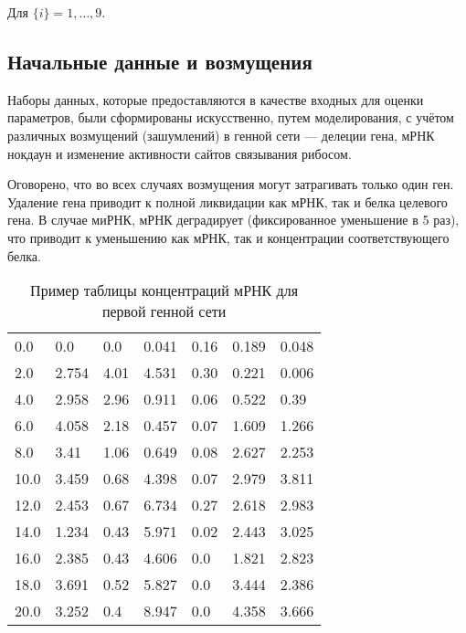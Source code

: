 Для $\{i\} = 1, \dots, 9$.

\subsection{Начальные данные и возмущения} \label{s2_4}

Наборы данных, которые предоставляются в качестве входных для оценки параметров,
были сформированы искусственно, путем моделирования, с учётом различных 
возмущений (зашумлений) в генной сети — делеции гена, мРНК нокдаун и изменение 
активности сайтов связывания рибосом. 

Оговорено, что во всех случаях возмущения могут затрагивать только один ген. 
Удаление гена приводит к полной ликвидации как мРНК, так и белка целевого гена. 
В случае миРНК, мРНК деградирует (фиксированное уменьшение в 5 раз), что 
приводит к уменьшению как мРНК, так и концентрации соответствующего белка.

\begin{table}[h]
  \centering
    \begin{tabular}{l|llllll}
        0.0	  & 0.0    & 0.0   & 0.041  & 0.16  & 0.189  & 0.048 \\
        2.0	  & 2.754  & 4.01  & 4.531  & 0.30  & 0.221  & 0.006 \\
        4.0	  & 2.958  & 2.96  & 0.911  & 0.06  & 0.522  & 0.39  \\
        6.0	  & 4.058  & 2.18  & 0.457  & 0.07  & 1.609  & 1.266 \\
        8.0	  & 3.41   & 1.06  & 0.649  & 0.08  & 2.627  & 2.253 \\
        10.0  & 3.459  & 0.68  & 4.398  & 0.07  & 2.979  & 3.811 \\
        12.0  & 2.453  & 0.67  & 6.734  & 0.27  & 2.618  & 2.983 \\
        14.0  & 1.234  & 0.43  & 5.971  & 0.02  & 2.443  & 3.025 \\
        16.0  & 2.385  & 0.43  & 4.606  & 0.0   & 1.821  & 2.823 \\
        18.0  & 3.691  & 0.52  & 5.827  & 0.0   & 3.444  & 2.386 \\
        20.0  & 3.252  & 0.4   & 8.947  & 0.0   & 4.358  & 3.666 
    \end{tabular}
  \caption{Пример таблицы концентраций мРНК для первой генной сети}
  \label{mRNAtable}
\end{table}

\clearpage
